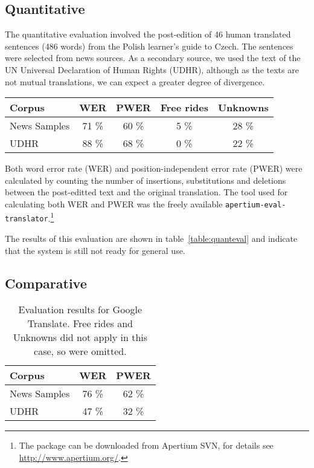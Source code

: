 \documentclass[11pt]{article}
\begin{document}
\subsection{Quantitative}

The quantitative evaluation involved the post-edition of 46 human translated
sentences (486 words) from the Polish learner's guide to Czech. The sentences were selected from 
news sources. As a secondary source, we used the text of the UN Universal Declaration of
Human Rights (UDHR), although as the texts are not mutual translations, we can expect
a greater degree of divergence.

\begin{table*}
\centering
\begin{tabular}{|l|c|c|c|c|}
\hline
Corpus    & WER & PWER & Free rides & Unknowns\\
\hline
News Samples & 71 \% & 60 \%  & 5 \%  & 28 \% \\
UDHR & 88 \% & 68 \%  & 0 \%  & 22 \% \\
\hline
\end{tabular}
    \caption{Evaluation results for the assimilation task. Free rides are those words which
       are identical in both the source and target language. Thus although they do not cause
       a degradation in translation quality, it is relevant to take them into account when
       evaluating the system. Unknown words are included as an indication of naïve coverage
       over the test sets.}
    \label{table:quanteval}
\end{table*}

Both word error rate (WER) and position-independent error rate (PWER) were 
calculated by counting the number of insertions, substitutions and deletions
between the post-editted text and the original translation. The tool used for
calculating both WER and PWER was the freely available {\tt\small apertium-eval-translator}.\footnote{The
package can be downloaded from Apertium SVN, for details see {\small \url{http://www.apertium.org/}}.}

The results of this evaluation are shown in table~\ref{table:quanteval} and 
indicate that the system is still not ready for general use.

\subsection{Comparative}

\begin{table}
\centering
\begin{tabular}{|l|c|c|}
\hline
Corpus    & WER & PWER \\
\hline
News Samples & 76 \% & 62 \%  \\
UDHR & 47 \% & 32 \% \\
\hline
\end{tabular}
    \caption{Evaluation results for Google Translate. Free rides and Unknowns
    did not apply in this case, so were omitted.}
    \label{table:googlecompar}
\end{table}
\end{document}
